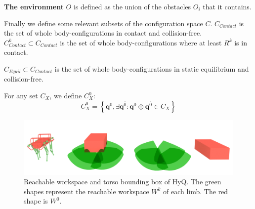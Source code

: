 \medskip
\textbf{The environment} $O$ is defined as the union of the obstacles $O_i$ that it contains.

\medskip
Finally we define some relevant subsets of the configuration space $C$.
$C_{Contact}$ is the set of whole body-configurations in contact and collision-free.
$C_{Contact}^k \subset C_{Contact}$ is the set of whole body-configurations where at least $R^k$ is in contact.

\medskip
$C_{Equil} \subset C_{Contact}$ is the set of whole body-configurations in static equilibrium and collision-free.

\medskip
For any set $C_{X}$, we define $C_{X}^0$:
\begin{equation*}
  C_{X}^0 = \left\{ \mathbf{q}^{0},  \exists \mathbf{q}^{\overline{0}}: \mathbf{q}^0  \oplus \mathbf{q}^{\overline{0}} \in C_{X} \right\}
\end{equation*}

\begin{figure}
  \centering
  \includegraphics[width=0.95\linewidth]{figures/HyQ_roms}
  \caption{
           Reachable workspace and torso bounding box of HyQ. The green shapes represent the reachable workspace $W^k$ of each limb. The red shape is $W^0$.}
		   \label{fig:HyQ_roms}
\end{figure}
